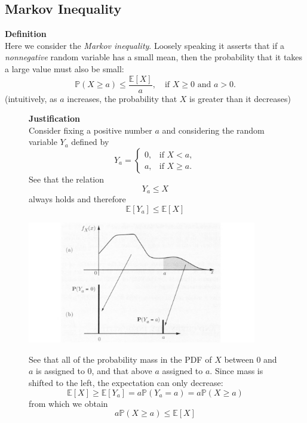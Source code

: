 \documentclass{report}
\begin{document}
\subsection{Markov Inequality}
\textbf{Definition}\\
Here we consider the \textit{Markov inequality}. Loosely speaking it asserts that
if a \textit{nonnegative} random variable has a small mean, then the probability that it takes a large value must
also be small:
\begin{equation*}
\boxed{\mathbb{P}(X\geq a)\leq\frac{\mathbb{E}[X]}{a},\quad\text{if $X\geq0$ and $a>0$.}}
\end{equation*}
(intuitively, as $a$ increases, the probability that $X$ is greater than it decreases)
\begin{figure}[h]
\textbf{Justification}\\
Consider fixing a positive number $a$ and considering the random variable $Y_a$ defined by
\begin{equation*}
Y_a=\begin{cases}
0,&\text{if }X<a,\\
a,&\text{if }X\geq a.
\end{cases}
\end{equation*}
See that the relation 
\begin{equation*}
Y_a\leq X
\end{equation*}
always holds and therefore
\begin{equation*}
\mathbb{E}[Y_a]\leq\mathbb{E}[X]
\end{equation*}
\begin{center}
\includegraphics[width=10cm]{2}\\
\end{center}
See that all of the probability mass in the PDF of $X$ between 0 and $a$ is assigned to 0, and that above $a$
assigned to $a$. Since mass is shifted to the left, the expectation can only decrease:
\begin{equation*}
\mathbb{E}[X]\geq\mathbb{E}[Y_a]=a\mathbb{P}(Y_a=a)
=a\mathbb{P}(X\geq a)
\end{equation*}
from which we obtain
\begin{equation*}
a\mathbb{P}(X\geq a)
\leq\mathbb{E}[X]
\end{equation*}
\end{figure}\\
\end{document}

